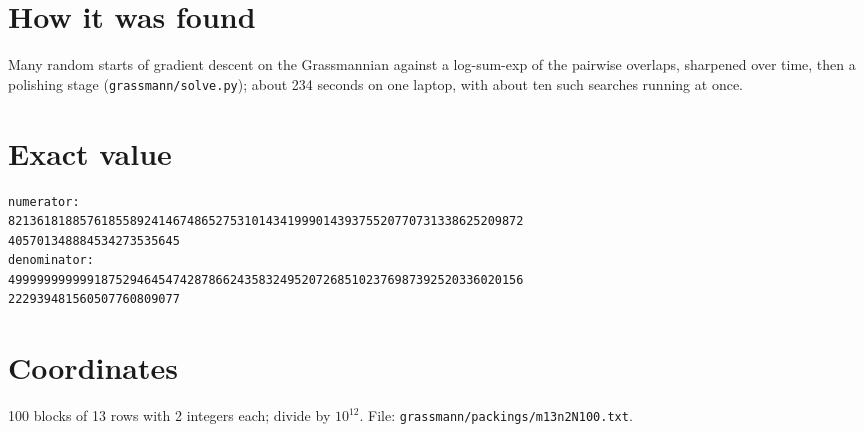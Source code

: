 \documentclass[11pt,a4paper]{article}
\begin{document}
\section{How it was found}
Many random starts of gradient descent on the Grassmannian against a log-sum-exp of the pairwise overlaps, sharpened over time, then a polishing stage (\texttt{grassmann/solve.py}); about 234 seconds on one laptop, with about ten such searches running at once.


\appendix
\section{Exact value}
{\small
\begin{verbatim}
numerator:
821361818857618558924146748652753101434199901439375520770731338625209872
405701348884534273535645
denominator:
499999999999187529464547428786624358324952072685102376987392520336020156
222939481560507760809077
\end{verbatim}}

\section{Coordinates}
100 blocks of 13 rows with 2 integers each; divide by $10^{12}$. File: \texttt{grassmann/packings/m13n2N100.txt}.
{\tiny
\begin{multicols}{4}
\end{multicols}}
\end{document}
